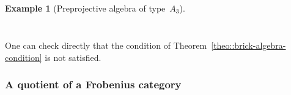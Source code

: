 \documentclass{amsart}
\theoremstyle{definition}
\newtheorem{example}[theorem]{Example}
\begin{document}
\begin{example}[Preprojective algebra of type~$A_3$]
\[{\begin{tikzcd}
  \end{tikzcd}
  }
 \]
 
One can check directly that the condition of Theorem~\ref{theo::brick-algebra-condition} is not satisfied. 
\end{example}



\subsubsection{A quotient of a Frobenius category}






\label{sec:biblio}
\end{document}

